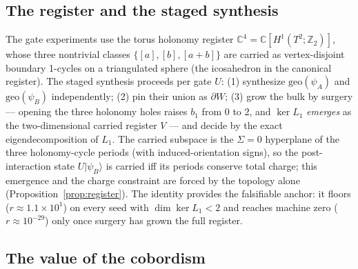 \documentclass[a4paper,twocolumn,11pt,unpublished]{quantumarticle}
\theoremstyle{plain}
\theoremstyle{remark}
\newcommand{\geo}{\mathrm{geo}}
\newcommand{\ket}[1]{|#1\rangle}
\newcommand{\kerL}{\ker L}
\begin{document}
\subsection{The register and the staged synthesis}
\label{sec:register}

The gate experiments use the torus holonomy register
$\mathbb{C}^4=\mathbb{C}[H^1(T^2;\mathbb{Z}_2)]$, whose three nontrivial
classes $\{[a],[b],[a{+}b]\}$ are carried as vertex-disjoint boundary
1-cycles on a triangulated sphere (the icosahedron in the canonical
register). The staged synthesis proceeds per gate $U$: (1) synthesize
$\geo(\psi_A)$ and $\geo(\psi_B)$ independently; (2) pin their union as
$\partial W$; (3) grow the bulk by surgery --- opening the three holonomy
holes raises $b_1$ from $0$ to $2$, and $\kerL_1$ \emph{emerges} as the
two-dimensional carried register $V$ --- and decide by the exact
eigendecomposition of $L_1$. The carried subspace is the $\Sigma=0$
hyperplane of the three holonomy-cycle periods (with induced-orientation
signs), so the post-interaction state $U\ket{\psi_B}$ is carried iff its
periods conserve total charge; this emergence and the charge constraint
are forced by the topology alone (Proposition~\ref{prop:register}). The
identity provides the falsifiable anchor: it floors
($r\approx1.1\times10^{1}$) on every seed with $\dim\kerL_1<2$ and reaches
machine zero ($r\approx10^{-29}$) only once surgery has grown the full
register.

\subsection{The value of the cobordism}
\label{sec:value}
\end{document}
